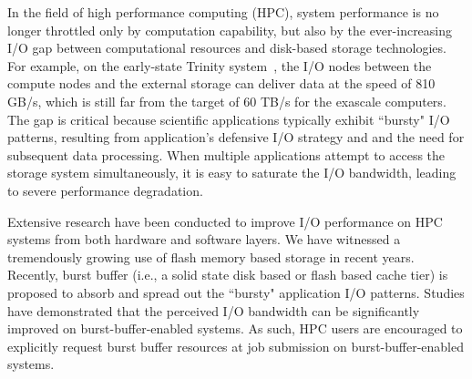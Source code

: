 In the field of high performance computing (HPC), 
system performance is no longer throttled only by computation capability,
but also by the ever-increasing I/O gap
between computational resources and disk-based storage technologies.
For example, on the early-state Trinity system~\cite{TrinitySystem}, the I/O nodes between
the compute nodes and the external storage can deliver data at  the speed of 810 GB/s,
which is still far from the target of 60 TB/s for the exascale computers\cite{Shalf:HPCCS:2010}.
The gap is critical because scientific applications typically exhibit
``bursty" I/O patterns,
resulting from application's defensive I/O strategy
and and the need  for subsequent data processing\cite{Carns:MSST:2011, Kim:PDSW:2010, Latham:CSD:2012, Naik:ICPPW:2009, Dennis:CUG:2009}. 
When multiple applications attempt to access the storage system simultaneously, 
it is easy to saturate
the I/O bandwidth, leading to severe performance degradation.


Extensive research have been conducted to improve I/O performance on HPC systems from
both hardware and software layers.
We have witnessed a tremendously growing use of flash memory based storage in recent years.
Recently, burst buffer (i.e., a solid state disk based or flash based cache tier)
is proposed to absorb and spread out
the ``bursty" application I/O patterns\cite{Bent:HBP:2011, Grider:EXA:2010}.
Studies have demonstrated that the perceived I/O
bandwidth can be significantly improved on burst-buffer-enabled systems\cite{Liu:MSST:2012}.
As such, HPC users are encouraged to explicitly request burst buffer resources at job submission 
on burst-buffer-enabled systems\cite{apex-workflow}.

